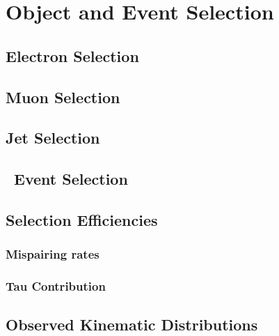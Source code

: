 \graphicspath{{Chapters/ObjEventSelection/Figures/}}
\chapter{Object and Event Selection}
\label{chap:ObjEventSelection}

\section{Electron Selection}
\section{Muon Selection}
\section{Jet Selection}
\section{\ZZ\ Event Selection}
\section{Selection Efficiencies}
\subsection{\CZZ}
\subsection{Mispairing rates}
\subsection{Tau Contribution}
\section{Observed Kinematic Distributions}
